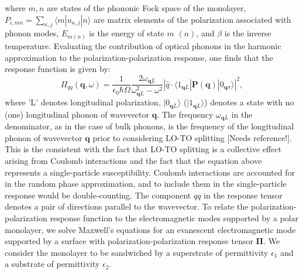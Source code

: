 \documentclass[aps,prb,twocolumn,
	groupedaddress,superscriptaddress,
	amsfonts,amssymb,amsmath,floatfix,
	citeautoscript]{revtex4-1}
\begin{document}
where $m,n$ are states of the phononic Fock space of the monolayer, $P_{i,mn} = \sum\limits_{\kappa,j}\langle m | u_{\kappa,j} | n \rangle$ are matrix elements of the polarization associated with phonon modes, $E_{m (n)}$ is the energy of state $m$ $(n)$, and $\beta$ is the inverse temperature. Evaluating the contribution of optical phonons in the harmonic approximation to the polarization-polarization response, one finds that the response function is given by: 
\begin{equation}
\Pi_{qq}(\mathbf{q},\omega) = \frac{1}{\epsilon_0\hbar\Omega} \frac{2\omega_{\mathbf{q}L}}{\omega^2_{\mathbf{q}L}-\omega^2}|\hat{q}\cdot\langle 1_{\mathbf{q}L}|\mathbf{P}(\mathbf{q})|0_{\mathbf{q}\sigma}\rangle|^2,
\end{equation}
where 'L' denotes longitudinal polarization, $|0_{\mathbf{q}L}\rangle$ ($|1_{\mathbf{q}L}\rangle$) denotes a state with no (one) longitudinal phonon of wavevector $\mathbf{q}$. The frequency $\omega_{\mathbf{q}L}$ in the denominator, as in the case of bulk phonons, is the frequency of the longitudinal phonon of wavevector $\mathbf{q}$ prior to considering LO-TO splitting [Needs reference!]. This is the consistent with the fact that LO-TO splitting is a collective effect arising from Coulomb interactions and the fact that the equation above represents a single-particle susceptibility. Coulomb interactions are accounted for in the random phase approximation, and to include them in the single-particle response would be double-counting. The component $qq$ in the response tensor denotes a pair of directions parallel to the wavevector.  
To relate the polarization-polarization response function to the electromagnetic modes supported by a polar monolayer, we solve Maxwell's equations for an evanescent electromagnetic mode supported by a surface with polarization-polarization response tensor $\mathbf{\Pi}$. We consider the monolayer to be sandwiched by a superstrate of permittivity $\epsilon_1$ and a substrate of permittivity $\epsilon_2$.
\end{document}
